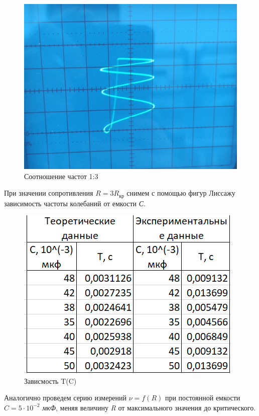 \documentclass[11pt]{article}
\begin{document}
\begin{figure}[h!]
\centering
\includegraphics[scale=0.15]{13.jpg}
\caption{Соотношение частот 1:3}
\label{fig:Image1}
\end{figure}

\vspace{0.5cm}

\newpage

При значении сопротивления $R = 3R_{\textit{кр}}$ снимем с помощью фигур Лиссажу зависимость частоты колебаний от емкости \textit{С}.

\begin{figure}[h!]
\centering
\includegraphics[scale=0.8]{table2.png}
\caption{Зависмость T(C)}
\label{fig:Image1}
\end{figure}

\vspace{0.5cm}
\newpage
Аналогично проведем серию измерений $\nu = f(R)$ при постоянной емкости $C = 5\cdot 10^{-2}$ \textit{мкФ}, меняя величину \textit{R} от максимального значения до критического.
\end{document}
